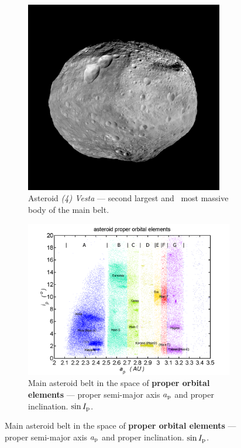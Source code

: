 \documentclass{beamer}
\newlength{\vyska}
\newlength{\vyskaA}
\newlength{\side}
\newlength{\main}
\begin{document}
\begin{frame}
\begin{columns}[t]
\begin{column}{\side}
\begin{tcolorbox}[title=Asteroids in the Solar System\vphantom{Úy},height=0.335\vyskaA,parbox=false]
		\begin{figure}[!htb]
			\begin{subfigure}[t]{0.44\textwidth}
			\centering
			\includegraphics[width=0.95\textwidth]{../obr/vesta.jpg}
			\caption{Asteroid \textit{(4) Vesta} --- second largest and~ most massive body of the main belt.} \label{fig:vesta}
			\end{subfigure}
			\begin{subfigure}[t]{0.55\textwidth}
			\centering
			\includegraphics[width=1.0\textwidth]{../obr/mainbelt.png}
			\caption{Main asteroid belt in the space of \textbf{proper orbital elements} --- proper semi-major axis $a_{\rm p}$ and proper inclination. $\sin I_{\rm p}$.} \label{fig:belt}
			\end{subfigure}
		\end{figure}
	\end{tcolorbox}


\end{column}
\end{columns}
\end{frame}
\end{document}
